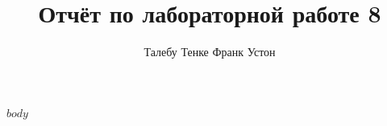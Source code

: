 \documentclass[a4paper,12pt]{article}
\title{\textbf{Отчёт по лабораторной работе 8}}
\author{Талебу Тенке Франк Устон}
\date{}
\begin{document}
\maketitle
\tableofcontents
\listoffigures
$body$
\end{document}
